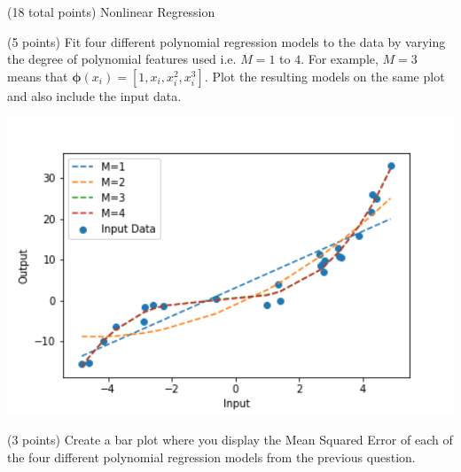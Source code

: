\documentclass[12pt]{article}
\begin{document}
\begin{question}{(18 total points) Nonlinear Regression}





%
%
\begin{subquestion}{(5 points) Fit four different polynomial regression models to the data  by varying the degree of polynomial features used i.e. $M = 1$ to $4$.
For example, $M=3$ means that $\boldsymbol{\phi}(x_i) = [1, x_i, x_i^2, x_i^3]$.
Plot the resulting models on the same plot and also include the input data.\\
}


\begin{answerbox}{35em}
\begin{center}
    \includegraphics[width=1\textwidth]{results/input-vs-output-nonlinear.png}
\end{center}
\end{answerbox}



\end{subquestion}


%
%
\begin{subquestion}{(3 points) Create a bar plot where you display the Mean Squared Error of each of the four different polynomial regression models from the previous question.}



\end{subquestion}
\end{question}
\end{document}
